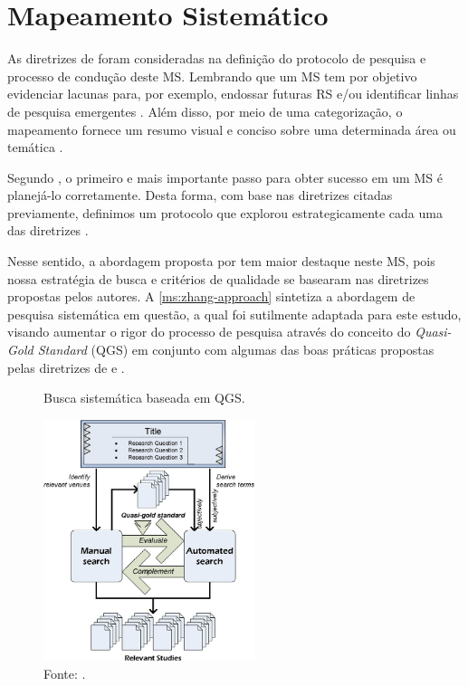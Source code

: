 \section{Mapeamento Sistemático}
\label{ms:conducao}

As diretrizes de  foram consideradas na definição do protocolo de pesquisa e processo de condução deste MS. Lembrando que um MS tem por objetivo evidenciar lacunas para, por exemplo, endossar futuras RS e/ou identificar linhas de pesquisa emergentes \cite{Kitchenham2007}. Além disso, por meio de uma categorização, o mapeamento fornece um resumo visual e conciso sobre uma determinada área ou temática \cite{Petersen2008}.

Segundo , o primeiro e mais importante passo para obter sucesso em um MS é planejá-lo corretamente. Desta forma, com base nas diretrizes citadas previamente, definimos um protocolo que explorou estrategicamente cada uma das diretrizes \cite{Kitchenham2007,Zhang2011,Petersen2015}.

Nesse sentido, a abordagem proposta por  tem maior destaque neste MS, pois nossa estratégia de busca e critérios de qualidade se basearam nas diretrizes propostas pelos autores. A \autoref{ms:zhang-approach} sintetiza a abordagem de pesquisa sistemática em questão, a qual foi sutilmente adaptada para este estudo, visando aumentar o rigor do processo de pesquisa através do conceito do \textit{Quasi-Gold Standard} (QGS) em conjunto com algumas das boas práticas propostas pelas diretrizes de  e .

\begin{figure}[htbp]
\caption{Busca sistemática baseada em QGS.}
\label{ms:zhang-approach}
\centerline{\includegraphics[width=0.55\textwidth]{images/zhang-systematic-mapping-approach.png}}
\caption*{Fonte: .}
\end{figure}

